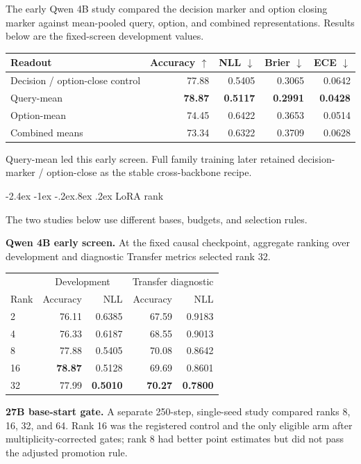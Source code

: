 \documentclass[10pt]{article}
\makeatletter
\renewcommand\subsection{\@startsection{subsection}{2}{\z@}%
  {-2.4ex \@plus -1ex \@minus -.2ex}{.8ex \@plus .2ex}%
  {\color{blue}\large\bfseries}}
\newcommand{\good}[1]{\textcolor{mint!60!black}{\textbf{#1}}}
\makeatother
\begin{document}
The early Qwen 4B study compared the decision marker and option closing marker
against mean-pooled query, option, and combined representations. Results below
are the fixed-screen development values.

\begin{tabular}{p{.38\linewidth}rrrr}
\toprule
Readout & Accuracy $\uparrow$ & NLL $\downarrow$ & Brier $\downarrow$ & ECE $\downarrow$ \\
\midrule
Decision / option-close control & 77.88 & 0.5405 & 0.3065 & 0.0642 \\
Query-mean & \good{78.87} & \good{0.5117} & \good{0.2991} & \good{0.0428} \\
Option-mean & 74.45 & 0.6422 & 0.3653 & 0.0514 \\
Combined means & 73.34 & 0.6322 & 0.3709 & 0.0628 \\
\bottomrule
\end{tabular}

Query-mean led this early screen. Full family training later retained
decision-marker / option-close as the stable cross-backbone recipe.

\subsection{LoRA rank}

The two studies below use different bases, budgets, and selection rules.

\textbf{Qwen 4B early screen.} At the fixed causal checkpoint, aggregate ranking
over development and diagnostic Transfer metrics selected rank 32.

\begin{tabular}{p{.20\linewidth}rr|rr}
\toprule
 & \multicolumn{2}{c|}{Development} & \multicolumn{2}{c}{Transfer diagnostic} \\
Rank & Accuracy & NLL & Accuracy & NLL \\
\midrule
2  & 76.11 & 0.6385 & 67.59 & 0.9183 \\
4  & 76.33 & 0.6187 & 68.55 & 0.9013 \\
8  & 77.88 & 0.5405 & 70.08 & 0.8642 \\
16 & \good{78.87} & 0.5128 & 69.69 & 0.8601 \\
32 & 77.99 & \good{0.5010} & \good{70.27} & \good{0.7800} \\
\bottomrule
\end{tabular}

\textbf{27B base-start gate.} A separate 250-step, single-seed study compared
ranks 8, 16, 32, and 64. Rank 16 was the registered control and the only eligible
arm after multiplicity-corrected gates; rank 8 had better point estimates but did
not pass the adjusted promotion rule.
\end{document}
